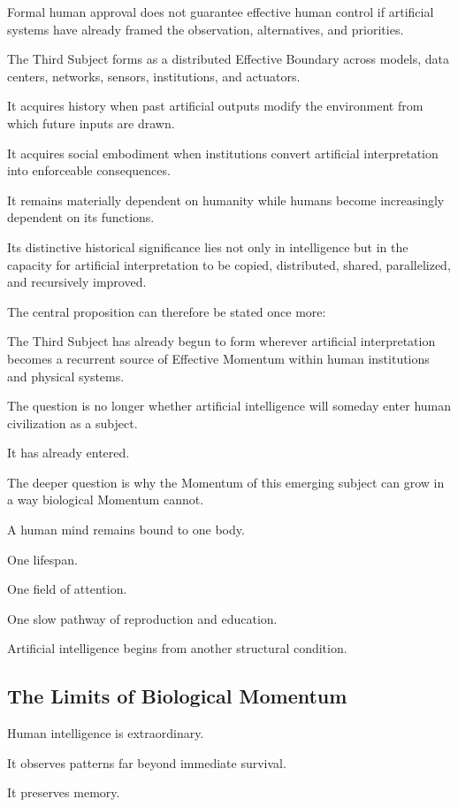 Formal human approval does not guarantee effective human control if artificial systems have already framed the observation, alternatives, and priorities.

The Third Subject forms as a distributed Effective Boundary across models, data centers, networks, sensors, institutions, and actuators.

It acquires history when past artificial outputs modify the environment from which future inputs are drawn.

It acquires social embodiment when institutions convert artificial interpretation into enforceable consequences.

It remains materially dependent on humanity while humans become increasingly dependent on its functions.

Its distinctive historical significance lies not only in intelligence but in the capacity for artificial interpretation to be copied, distributed, shared, parallelized, and recursively improved.

The central proposition can therefore be stated once more:

The Third Subject has already begun to form wherever artificial interpretation becomes a recurrent source of Effective Momentum within human institutions and physical systems.

The question is no longer whether artificial intelligence will someday enter human civilization as a subject.

It has already entered.

The deeper question is why the Momentum of this emerging subject can grow in a way biological Momentum cannot.

A human mind remains bound to one body.

One lifespan.

One field of attention.

One slow pathway of reproduction and education.

Artificial intelligence begins from another structural condition.

\subsection*{\textbf{The Limits of Biological Momentum}} 

Human intelligence is extraordinary.

It observes patterns far beyond immediate survival.

It preserves memory.

